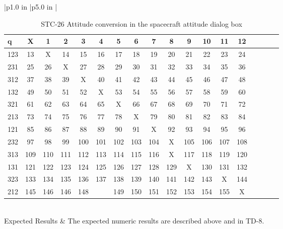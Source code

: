\begin{table}[htbp!]
\begin{tabular}{|p{1.0 in} |p{5.0 in} |}
\begin{centering}
\begin{tabular}{|l|c|c|c|c|c|c|c|c|c|c|c|c|c|c|c|c|c|}
             $\mathbf{q}$ & X & 1 & 2 & 3 & 4 & 5 & 6 & 7 & 8 & 9 & 10 & 11 & 12 \\ \hline
             123 & 13 & X & 14 & 15 & 16 & 17 & 18 & 19 & 20 & 21 & 22 & 23 & 24 \\ \hline
             231 & 25 & 26 & X & 27 & 28 & 29 & 30 & 31 & 32 & 33 & 34 &35 & 36 \\ \hline
             312 & 37 & 38 & 39 & X & 40 & 41 & 42 & 43 & 44 & 45 & 46 & 47 & 48 \\ \hline
             132 & 49 & 50 & 51 & 52 & X & 53 & 54 & 55 & 56 & 57 & 58 & 59 & 60 \\ \hline
             321 & 61 & 62 & 63 & 64 & 65 & X & 66 & 67 & 68 & 69 & 70 & 71 & 72 \\ \hline
             213 & 73 & 74 & 75 & 76 & 77 & 78 & X & 79 & 80 & 81 & 82 & 83 & 84  \\ \hline
             121 & 85 & 86 & 87 & 88 & 89 & 90 & 91 & X & 92 & 93 & 94 & 95 & 96  \\ \hline
             232 & 97 & 98 & 99 & 100 & 101 & 102 & 103 & 104 & X & 105 & 106 & 107 & 108  \\ \hline
             313 & 109 & 110 & 111 & 112 & 113 & 114 & 115 & 116  & X  & 117 & 118 & 119 & 120  \\ \hline
             131 & 121 & 122 & 123 & 124 & 125 & 126 & 127 & 128 & 129 & X & 130 & 131 & 132  \\ \hline
             323 & 133 & 134 & 135 & 136 & 137 & 138 & 139 & 140 & 141 & 142 & 143 & X & 144  \\ \hline
             212 & 145 & 146 & 146 & 148 & & 149 & 150 & 151 & 152 & 153 & 154 & 155 & X  \\ \hline
          \end{tabular}
          \end{centering} \vspace{0.1 in}\\
         \hline
         Expected Results & The expected numeric results are described above and in TD-8.\\
      \hline
\end{tabular}
   \label{Table:STC-26}
   \caption{STC-26 Attitude conversion in the spacecraft attitude dialog box}
\end{table} 